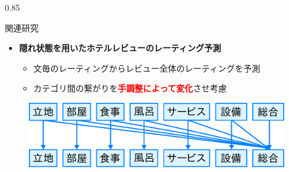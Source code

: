 \documentclass[unicode,10pt]{beamer}
\newlength{\mycolumnwidth}
\newcommand{\itemtitle}[1]{\textbf{#1}\\}
\newcommand{\fire}[1]{\textcolor{red}{\textbf{#1}}}
\begin{document}
\begin{frame}[t]
\begin{columns}[onlytextwidth,t]
\begin{column}{0.85\mycolumnwidth}
  \begin{block}{関連研究}
    \begin{itemize}
      \item \itemtitle{隠れ状態を用いたホテルレビューのレーティング予測
                       \cite{fujitani15}}
        \begin{itemize}
          \item 文毎のレーティングからレビュー全体のレーティングを予測
          \item カテゴリ間の繋がりを\fire{手調整によって変化}させ考慮
        \end{itemize}
    \end{itemize}

    \begin{figure}
      \includegraphics[width=0.7\linewidth]
          {fig/fujitani_miml_relations_among_rating_categories.pdf}
    \end{figure}


\end{block}
\end{column}
\end{columns}
\end{frame}
\end{document}

